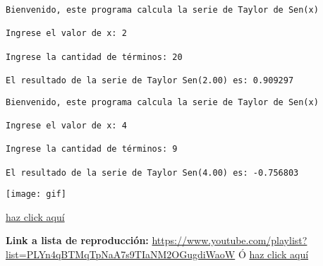 \begin{lstlisting}
Bienvenido, este programa calcula la serie de Taylor de Sen(x)

Ingrese el valor de x: 2

Ingrese la cantidad de términos: 20

El resultado de la serie de Taylor Sen(2.00) es: 0.909297
\end{lstlisting}

\begin{lstlisting}
Bienvenido, este programa calcula la serie de Taylor de Sen(x)

Ingrese el valor de x: 4

Ingrese la cantidad de términos: 9

El resultado de la serie de Taylor Sen(4.00) es: -0.756803
\end{lstlisting}




\begin{center}
    \texttt{[image: gif]} %
\end{center}
\begin{center}
    \href{https://github.com/adriancho91s/fourthWorkshopC}{haz click aquí}
\end{center}


\textbf{Link a lista de reproducción:}
\url{https://www.youtube.com/playlist?list=PLYn4qBTMqTpNaA7s9TIaNM2OGugdiWaoW}
Ó
\href{https://www.youtube.com/playlist?list=PLYn4qBTMqTpNaA7s9TIaNM2OGugdiWaoW}{haz click aquí}